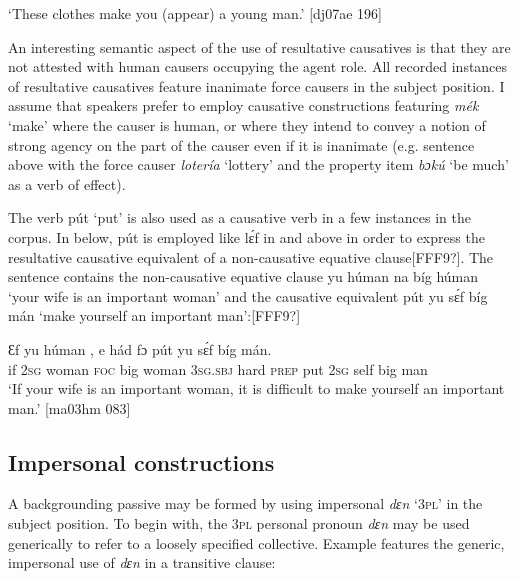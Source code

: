 \glt ‘These clothes make you (appear) a young man.’ [dj07ae 196]
\z

An interesting semantic aspect of the use of resultative causatives is that they are not attested with human causers occupying the agent role. All recorded instances of resultative causatives feature inanimate force causers in the subject position. I assume that speakers prefer to employ causative constructions featuring \textit{mék} ‘make’ where the causer is human, or where they intend to convey a notion of strong agency on the part of the causer even if it is inanimate (e.g. sentence  above with the force causer \textit{lotería} ‘lottery’ and the property item \textit{b}\textit{ɔ}\textit{kú} ‘be much’ as a verb of effect).


The verb pút ‘put’ is also used as a causative verb in a few instances in the corpus. In  below, pút is employed like lɛ́f in  and  above in order to express the resultative causative equivalent of a non-causative equative clause[FFF9?]. The sentence contains the non-causative equative clause yu húman na bíg húman ‘your wife is an important woman’ and the causative equivalent pút yu sɛ́f bíg mán ‘make yourself an important man’:[FFF9?]



\ea%
    \label{ex:key:1340}
    \gll Ɛf  yu  húman      ,  e    hád    fɔ
pút     yu  sɛ́f  bíg  mán.\\
if  \textsc{2sg}  woman  \textsc{foc}  big  woman  \textsc{3sg.sbj}  hard  \textsc{prep}
put    \textsc{2sg}  self  big  man\\

\glt ‘If your wife is an important woman, it is difficult to make yourself 
an important man.’ [ma03hm 083]
\z

\subsection{Impersonal constructions}\label{sec:9.4.5}

A backgrounding passive may be formed by using impersonal \textit{dɛn} ‘\textsc{3pl’} in the subject position. To begin with, the \textsc{3pl} personal pronoun \textit{dɛn} may be used generically to refer to a loosely specified collective. Example  features the generic, impersonal use of \textit{dɛn} in a transitive clause: 


